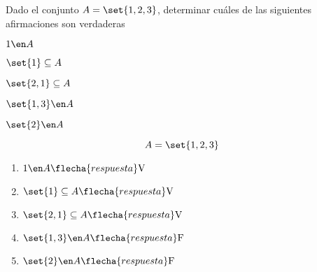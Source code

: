 \begin{enunciado}{\ejercicio}
  Dado el conjunto $A = \set{1,2,3}$, determinar cuáles de las siguientes afirmaciones son verdaderas
  \begin{enumerate}[label=(\roman*)]
    \begin{multicols}{5}
      \item $1 \en A $
      \item $\set{1} \subseteq A $
      \item $\set{2,1} \subseteq A $
      \item $\set{1,3} \en A $
      \item $\set{2} \en A $
    \end{multicols}
  \end{enumerate}

\end{enunciado}

$$
  A = \set{1,2,3}
$$
\begin{multicols}{3}
  \begin{enumerate}[label=(\roman*)]
    \item $1 \en A \flecha{respuesta} \text{V}$
    \item $\set{1} \subseteq A \flecha{respuesta} \text{V}$
    \item $\set{2,1} \subseteq A \flecha{respuesta} \text{V}$
    \item $\set{1,3} \en A \flecha{respuesta} \text{F}$
    \item $\set{2} \en A \flecha{respuesta} \text{F}$
  \end{enumerate}
\end{multicols}

\begin{aportes}
  \item {}
\end{aportes}
